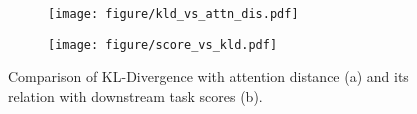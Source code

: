 

\begin{figure}
    \centering
    \begin{subfigure}[b]{0.49\columnwidth}
        \centering
         \texttt{[image: figure/kld\_vs\_attn\_dis.pdf]}
        \caption{}
        \label{fig:kld_vs_attn_dis}
    \end{subfigure}
    \hfill
    \begin{subfigure}[b]{0.49\columnwidth}
        \centering
         \texttt{[image: figure/score\_vs\_kld.pdf]}
        \caption{}
        \label{fig:score_vs_kld}
    \end{subfigure}
    \vspace{-0.1in}
    \caption{Comparison of KL-Divergence with attention distance (a) and its relation with downstream task scores (b).}
    \label{fig:combined}
\end{figure}
